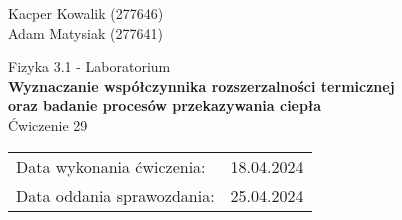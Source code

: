 \begin{flushright}
    Kacper Kowalik (277646) \\
    Adam Matysiak (277641)
\end{flushright}

\vspace{2mm}

\begin{center}
    Fizyka 3.1 - Laboratorium \\
    \vspace{15px}
    {\Large{\textbf{
    Wyznaczanie współczynnika rozszerzalności termicznej\\
    oraz badanie procesów przekazywania ciepła
    }}} \\
    \vspace{15px}
    Ćwiczenie 29 \\
\end{center}
    
\begin{flushright}
    \begin{tabular}{lr}
         Data wykonania ćwiczenia:  & 18.04.2024 \\
         Data oddania sprawozdania: & 25.04.2024
    \end{tabular}
\end{flushright}
